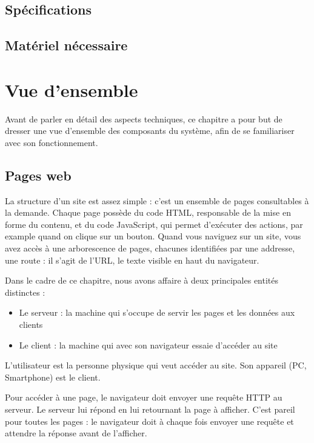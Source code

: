 \documentclass[
    iai, %
    eai, %
]{heig-tb}
\begin{document}
\section{Spécifications}
\section{Matériel nécessaire}
\chapter{Vue d'ensemble}

Avant de parler en détail des aspects techniques, ce chapitre a pour but de dresser une vue d'ensemble des composants du système, afin de se familiariser avec son fonctionnement.

\section{Pages web}

La structure d'un site est assez simple : c'est un ensemble de pages consultables à la demande. Chaque page possède du code HTML, responsable de la mise en forme du contenu, et du code JavaScript, qui permet d'exécuter des actions, par example quand on clique sur un bouton.
Quand vous naviguez sur un site, vous avez accès à une arborescence de pages, chacunes identifiées par une addresse, une route : il s'agit de l'URL, le texte visible en haut du navigateur.

Dans le cadre de ce chapitre, nous avons affaire à deux principales entités distinctes :
\begin{itemize}
  \item Le serveur : la machine qui s'occupe de servir les pages et les données aux clients
  \item Le client : la machine qui avec son navigateur essaie d'accéder au site
\end{itemize}
\bigskip
L'utilisateur est la personne physique qui veut accéder au site. Son appareil (PC, Smartphone) est le client.

Pour accéder à une page, le navigateur doit envoyer une requête HTTP au serveur. Le serveur lui répond en lui retournant la page à afficher.
C'est pareil pour toutes les pages : le navigateur doit à chaque fois envoyer une requête et attendre la réponse avant de l'afficher.

\end{document}

